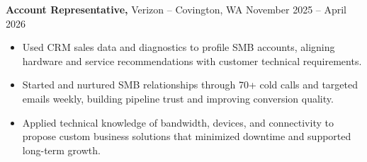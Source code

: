 \documentclass[11pt]{article}       %
\begin{document}
\textbf{Account Representative,} {Verizon} -- Covington, WA \hfill November 2025 -- April 2026 \\
\vspace{-9pt}
\begin{itemize}
  \item Used CRM sales data and diagnostics to profile SMB accounts, aligning hardware and service recommendations with customer technical requirements.
  \item Started and nurtured SMB relationships through 70+ cold calls and targeted emails weekly, building pipeline trust and improving conversion quality.
  \item Applied technical knowledge of bandwidth, devices, and connectivity to propose custom business solutions that minimized downtime and supported long-term growth.
\end{itemize}

\end{document}
